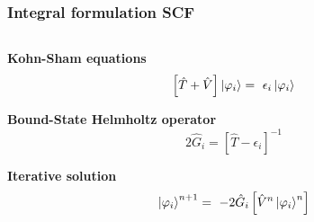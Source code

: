 \begin{frame}
    \frametitle{Integral formulation SCF}
    \begin{columns}
    \begin{column}[b]{0.5\textwidth}

    \centering
    \textbf{Kohn-Sham equations}
    \begin{equation}
        \nonumber
        \left[\hat{T} + \hat{V}\right]\ket{\orbital_i} =\ 
        \epsilon_i \ket{\orbital_i}
    \end{equation}

    \vspace{5mm}

    \textbf{Bound-State Helmholtz operator}
    \begin{equation}
        \nonumber
        2\hat{G}_i  = \left[\hat{T} - \epsilon_i\right]^{-1} 
    \end{equation}

    \vspace{5mm}

    \textbf{Iterative solution}
    \begin{equation}
        \nonumber
        \ket{\orbital_i}^{n+1} =\ -2\Helmholtz{\hat{V}^n\ket{\orbital_i}^n}
    \end{equation}

    \vspace{10mm}
    \end{column}


\end{columns}
\end{frame}
